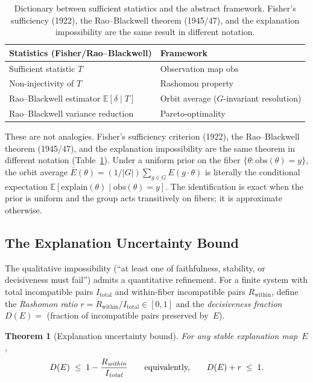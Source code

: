 \documentclass[11pt,a4paper]{article}
\newtheorem{theorem}{Theorem}[section]
\newcommand{\E}{\mathbb{E}}
\begin{document}
\begin{table}[t]
  \centering
  \small
  \begin{tabular}{@{}ll@{}}
    \toprule
    \textbf{Statistics (Fisher/Rao--Blackwell)} & \textbf{Framework} \\
    \midrule
    Sufficient statistic $T$ & Observation map $\mathrm{obs}$ \\
    Non-injectivity of $T$ & Rashomon property \\
    Rao--Blackwell estimator $\E[\delta \mid T]$ & Orbit average ($G$-invariant resolution) \\
    Rao--Blackwell variance reduction & Pareto-optimality \\
    \bottomrule
  \end{tabular}
  \caption{Dictionary between sufficient statistics and the abstract framework.
    Fisher's sufficiency (1922), the Rao--Blackwell theorem (1945/47), and the
    explanation impossibility are the same result in different notation.}
  \label{tab:sufficiency-dictionary}
\end{table}

These are not analogies.  Fisher's sufficiency criterion (1922), the
Rao--Blackwell theorem (1945/47), and the explanation impossibility are the
same theorem in different notation (Table~\ref{tab:sufficiency-dictionary}).
Under a uniform prior on the fiber $\{\theta : \mathrm{obs}(\theta) = y\}$, the orbit average $\bar{E}(\theta) = (1/|G|)\sum_{g \in G} E(g \cdot \theta)$ is literally the conditional expectation $\E[\mathrm{explain}(\theta) \mid \mathrm{obs}(\theta) = y]$.  The identification is exact when the prior is uniform and the group acts transitively on fibers; it is approximate otherwise.

\subsection{The Explanation Uncertainty Bound}
\label{sec:bridge-uncertainty}

The qualitative impossibility (``at least one of faithfulness, stability, or
decisiveness must fail'') admits a quantitative refinement.  For a finite
system with total incompatible pairs $I_{\text{total}}$ and within-fiber
incompatible pairs $R_{\text{within}}$, define the \emph{Rashomon ratio}
$r = R_{\text{within}} / I_{\text{total}} \in [0,1]$ and the
\emph{decisiveness fraction} $D(E) = $ (fraction of incompatible pairs
preserved by~$E$).

\begin{theorem}[Explanation uncertainty bound]
\label{thm:uncertainty-principle}
For any stable explanation map~$E$,
\[
  D(E) \;\leq\; 1 - \frac{R_{\emph{within}}}{I_{\emph{total}}}
  \qquad\text{equivalently,}\qquad D(E) + r \;\leq\; 1.
\]
\end{theorem}
\end{document}
